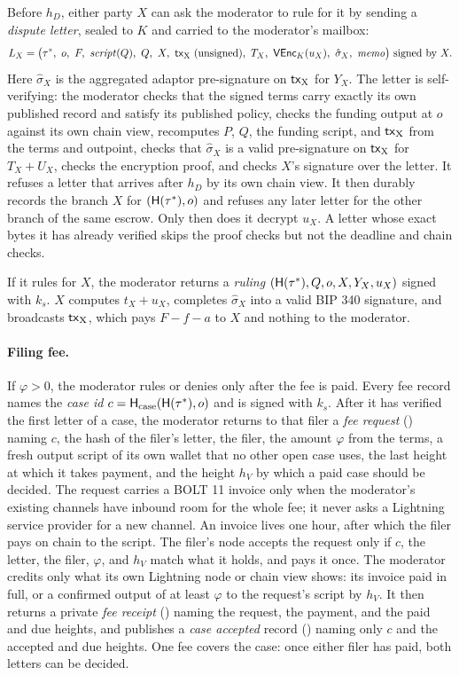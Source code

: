 Before $h_D$, either party $X$ can ask the moderator to rule for it by sending a \emph{dispute letter}, sealed to $K$ and carried to the moderator's mailbox:
\[
  L_X = \bigl(\tau^\ast,\ o,\ F,\ \mathit{script}(Q),\ Q,\ X,\ \tx{X}\ \text{(unsigned)},\ T_X,\ \mathsf{VEnc}_K(u_X),\ \hat\sigma_X,\ \mathit{memo}\bigr)\ \text{signed by } X.
\]
Here $\hat\sigma_X$ is the aggregated adaptor pre-signature on $\mathsf{tx}_{\mathrm{X}}$ for $Y_X$. The letter is self-verifying: the moderator checks that the signed terms carry exactly its own published record and satisfy its published policy, checks the funding output at $o$ against its own chain view, recomputes $P$, $Q$, the funding script, and $\mathsf{tx}_{\mathrm{X}}$ from the terms and outpoint, checks that $\hat\sigma_X$ is a valid pre-signature on $\mathsf{tx}_{\mathrm{X}}$ for $T_X+U_X$, checks the encryption proof, and checks $X$'s signature over the letter. It refuses a letter that arrives after $h_D$ by its own chain view. It then durably records the branch $X$ for $(\mathsf{H}(\tau^\ast),o)$ and refuses any later letter for the other branch of the same escrow. Only then does it decrypt $u_X$. A letter whose exact bytes it has already verified skips the proof checks but not the deadline and chain checks.

If it rules for $X$, the moderator returns a \emph{ruling} $(\mathsf{H}(\tau^\ast), Q, o, X, Y_X, u_X)$ signed with $k_s$. $X$ computes $t_X+u_X$, completes $\hat\sigma_X$ into a valid BIP 340 signature, and broadcasts $\mathsf{tx}_{\mathrm{X}}$, which pays $F-f-a$ to $X$ and nothing to the moderator.

\paragraph{Filing fee.} If $\varphi>0$, the moderator rules or denies only after the fee is paid. Every fee record names the \emph{case id} $c=\mathsf{H}_{\mathrm{case}}(\mathsf{H}(\tau^\ast),o)$ and is signed with $k_s$. After it has verified the first letter of a case, the moderator returns to that filer a \emph{fee request} () naming $c$, the hash of the filer's letter, the filer, the amount $\varphi$ from the terms, a fresh output script of its own wallet that no other open case uses, the last height at which it takes payment, and the height $h_V$ by which a paid case should be decided. The request carries a BOLT 11 invoice only when the moderator's existing channels have inbound room for the whole fee; it never asks a Lightning service provider for a new channel. An invoice lives one hour, after which the filer pays on chain to the script. The filer's node accepts the request only if $c$, the letter, the filer, $\varphi$, and $h_V$ match what it holds, and pays it once. The moderator credits only what its own Lightning node or chain view shows: its invoice paid in full, or a confirmed output of at least $\varphi$ to the request's script by $h_V$. It then returns a private \emph{fee receipt} () naming the request, the payment, and the paid and due heights, and publishes a \emph{case accepted} record () naming only $c$ and the accepted and due heights. One fee covers the case: once either filer has paid, both letters can be decided.

